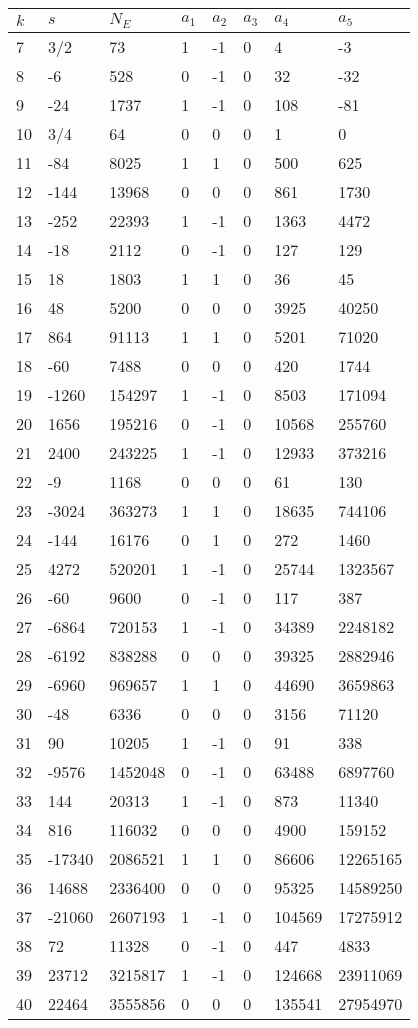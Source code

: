 \documentclass{amsart}
\begin{document}
\begin{longtable}{|l|l|l|lllll|}
\hline
$k$ & $s$ & $N_E$ & $a_1$ & $a_2$ & $a_3$ & $a_4$ & $a_5$\\
\hline
7&3/2&73&1&-1&0&4&-3\\
8&-6&528&0&-1&0&32&-32\\
9&-24&1737&1&-1&0&108&-81\\
10&3/4&64&0&0&0&1&0\\
11&-84&8025&1&1&0&500&625\\
12&-144&13968&0&0&0&861&1730\\
13&-252&22393&1&-1&0&1363&4472\\
14&-18&2112&0&-1&0&127&129\\
15&18&1803&1&1&0&36&45\\
16&48&5200&0&0&0&3925&40250\\
17&864&91113&1&1&0&5201&71020\\
18&-60&7488&0&0&0&420&1744\\
19&-1260&154297&1&-1&0&8503&171094\\
20&1656&195216&0&-1&0&10568&255760\\
21&2400&243225&1&-1&0&12933&373216\\
22&-9&1168&0&0&0&61&130\\
23&-3024&363273&1&1&0&18635&744106\\
24&-144&16176&0&1&0&272&1460\\
25&4272&520201&1&-1&0&25744&1323567\\
26&-60&9600&0&-1&0&117&387\\
27&-6864&720153&1&-1&0&34389&2248182\\
28&-6192&838288&0&0&0&39325&2882946\\
29&-6960&969657&1&1&0&44690&3659863\\
30&-48&6336&0&0&0&3156&71120\\
31&90&10205&1&-1&0&91&338\\
32&-9576&1452048&0&-1&0&63488&6897760\\
33&144&20313&1&-1&0&873&11340\\
34&816&116032&0&0&0&4900&159152\\
35&-17340&2086521&1&1&0&86606&12265165\\
36&14688&2336400&0&0&0&95325&14589250\\
37&-21060&2607193&1&-1&0&104569&17275912\\
38&72&11328&0&-1&0&447&4833\\
39&23712&3215817&1&-1&0&124668&23911069\\
40&22464&3555856&0&0&0&135541&27954970\\

\end{longtable}
\end{document}
